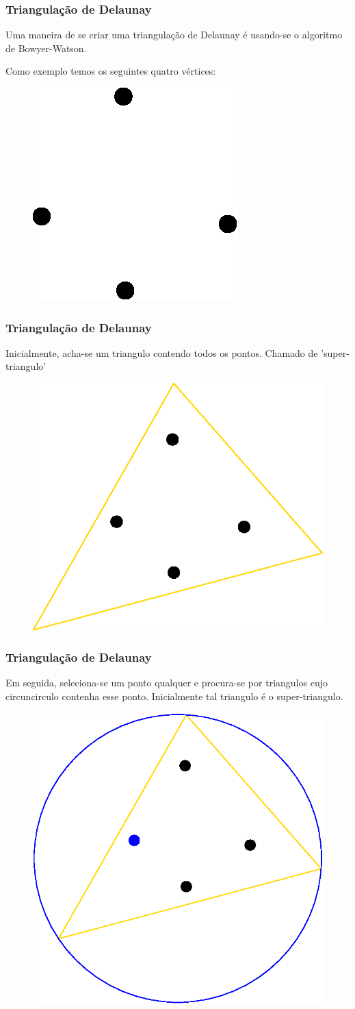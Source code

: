 \documentclass{beamer}
\begin{document}
\begin{frame}
  \frametitle{Triangulação de Delaunay}

  Uma maneira de se criar uma triangulação de Delaunay é usando-se o algoritmo de Bowyer-Watson.

  Como exemplo temos os seguintes quatro vértices:

  \begin{figure}
    \includegraphics[width=0.3\linewidth]{dela4.eps}
  \end{figure}
\end{frame}


\begin{frame}
  \frametitle{Triangulação de Delaunay}

  Inicialmente, acha-se um triangulo contendo todos os pontos. Chamado de 'super-triangulo'


  \begin{figure}
    \includegraphics[width=0.5\linewidth]{dela5.eps}
  \end{figure}
\end{frame}

\begin{frame}
  \frametitle{Triangulação de Delaunay}

  Em seguida, seleciona-se um ponto qualquer e procura-se por triangulos cujo circuncirculo contenha esse ponto. Inicialmente tal triangulo é o super-triangulo.

  \begin{figure}
    \includegraphics[width=0.5\linewidth]{dela6.eps}
  \end{figure}
\end{frame}
\end{document}
